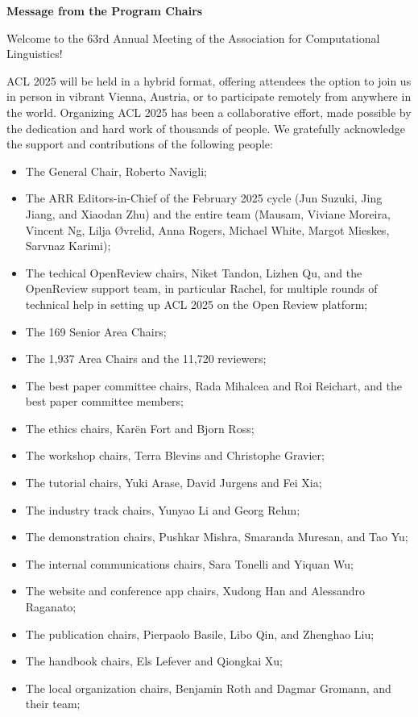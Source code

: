 \textbf{Message from the Program Chairs}

Welcome to the 63rd Annual Meeting of the Association for Computational Linguistics!

ACL 2025 will be held in a hybrid format, offering attendees the option to join us in person in vibrant Vienna, Austria, or to participate remotely from anywhere in the world. Organizing ACL 2025 has been a collaborative effort, made possible by the dedication and hard work of thousands of people. We gratefully acknowledge the support and contributions of the following people:

\begin{itemize}
\item The General Chair, Roberto Navigli;
\item The ARR Editors-in-Chief of the February 2025 cycle (Jun Suzuki, Jing Jiang, and Xiaodan Zhu) and the entire team (Mausam, Viviane Moreira, Vincent Ng, Lilja Øvrelid, Anna Rogers, Michael White, Margot Mieskes, Sarvnaz Karimi);
\item The techical OpenReview chairs, Niket Tandon, Lizhen Qu, and the OpenReview support team, in particular Rachel, for multiple rounds of technical help in setting up ACL 2025 on the Open Review platform;
\item The 169 Senior Area Chairs;
\item The 1,937 Area Chairs and the 11,720  reviewers; 
\item The best paper committee chairs, Rada Mihalcea and Roi Reichart, and the best paper committee members; 
\item The ethics chairs, Karën Fort and Bjorn Ross; 
\item The workshop chairs, Terra Blevins and Christophe Gravier;
\item The tutorial chairs, Yuki Arase, David Jurgens and Fei Xia;
\item The industry track chairs, Yunyao Li and Georg Rehm;
\item The demonstration chairs, Pushkar Mishra, Smaranda Muresan, and Tao Yu;
\item The internal communications chairs, Sara Tonelli and Yiquan Wu;
\item The website and conference app chairs, Xudong Han and Alessandro Raganato; 
\item The publication chairs, Pierpaolo Basile, Libo Qin, and Zhenghao Liu;
\item The handbook chairs, Els Lefever and Qiongkai Xu;
\item The local organization chairs, Benjamin Roth and Dagmar Gromann, and their team;

\end{itemize}
